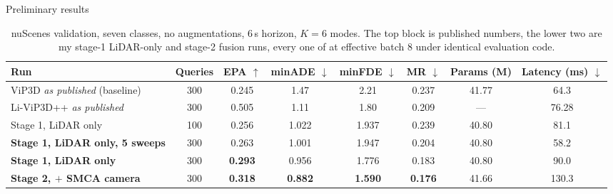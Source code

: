 \documentclass[aspectratio=169,11pt,t]{beamer}
\newcommand{\refcite}[1]{\textcolor{tuered}{\scriptsize\cite{#1}}}
\newcommand{\up}{$\uparrow$}
\newcommand{\dn}{$\downarrow$}
\begin{document}
\begin{frame}{Preliminary results}
  \footnotesize
  \vspace{0.3em}
  \begin{table}
    \centering
    \caption{nuScenes validation, seven classes, no augmentations, 6\,s horizon, $K = 6$ modes.
      The top block is published numbers, the lower two are my stage-1
      LiDAR-only and stage-2 fusion runs, every one of at effective
      batch 8 under identical evaluation code.}
    \scriptsize
    \setlength{\tabcolsep}{2.5pt}
    \begin{tabular}{lccccccc}
      \toprule
      Run & Queries & EPA \up & minADE \dn & minFDE \dn & MR \dn & Params (M) & \textbf{Latency (ms)} \dn \\
      \midrule
      ViP3D \emph{as published}\refcite{Gu2023ViP3D} (baseline)     & 300 & 0.245 & 1.47  & 2.21  & 0.237 & 41.77 & 64.3 \\
      Li-ViP3D++ \emph{as published}\refcite{Halinkovic2026LiViP3DPP} & 300 & 0.505 & 1.11 & 1.80 & 0.209 & --- & 76.28 \\
      \midrule
      Stage 1, LiDAR only             & 100 & 0.256 & 1.022 & 1.937 & 0.239 & 40.80 & 81.1\\
      \textbf{Stage 1, LiDAR only, 5 sweeps} & 300 & \alert{0.263} & 1.001 & 1.947 & 0.204 & 40.80 & \alert{58.2} \\
      \textbf{Stage 1, LiDAR only}             & 300 & \alert{\textbf{0.293}} & 0.956 & 1.776 & 0.183 & 40.80 & 90.0\\
      \midrule
      \textbf{Stage 2, $+$ SMCA camera} & 300 & \alert{\textbf{0.318}} & \alert{\textbf{0.882}} & \alert{\textbf{1.590}} & \textbf{0.176} & 41.66 & 130.3 \\
      \bottomrule
    \end{tabular}
  \end{table}
  \vspace{0.1em}


\end{frame}
\end{document}
